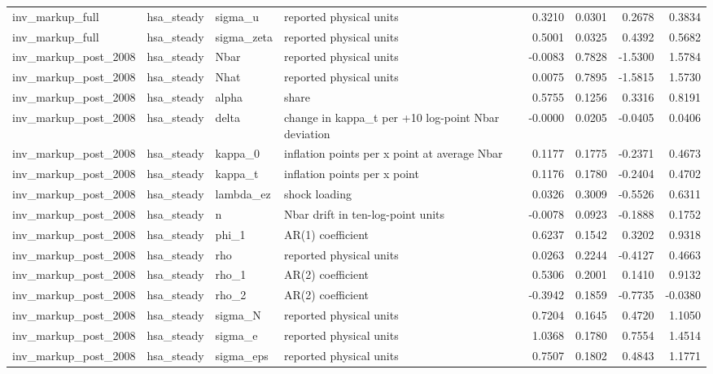 \begin{tabular}{llllrrrr}
inv\_markup\_full & hsa\_steady & sigma\_u & reported physical units & 0.3210 & 0.0301 & 0.2678 & 0.3834 \\
inv\_markup\_full & hsa\_steady & sigma\_zeta & reported physical units & 0.5001 & 0.0325 & 0.4392 & 0.5682 \\
inv\_markup\_post\_2008 & hsa\_steady & Nbar & reported physical units & -0.0083 & 0.7828 & -1.5300 & 1.5784 \\
inv\_markup\_post\_2008 & hsa\_steady & Nhat & reported physical units & 0.0075 & 0.7895 & -1.5815 & 1.5730 \\
inv\_markup\_post\_2008 & hsa\_steady & alpha & share & 0.5755 & 0.1256 & 0.3316 & 0.8191 \\
inv\_markup\_post\_2008 & hsa\_steady & delta & change in kappa\_t per +10 log-point Nbar deviation & -0.0000 & 0.0205 & -0.0405 & 0.0406 \\
inv\_markup\_post\_2008 & hsa\_steady & kappa\_0 & inflation points per x point at average Nbar & 0.1177 & 0.1775 & -0.2371 & 0.4673 \\
inv\_markup\_post\_2008 & hsa\_steady & kappa\_t & inflation points per x point & 0.1176 & 0.1780 & -0.2404 & 0.4702 \\
inv\_markup\_post\_2008 & hsa\_steady & lambda\_ez & shock loading & 0.0326 & 0.3009 & -0.5526 & 0.6311 \\
inv\_markup\_post\_2008 & hsa\_steady & n & Nbar drift in ten-log-point units & -0.0078 & 0.0923 & -0.1888 & 0.1752 \\
inv\_markup\_post\_2008 & hsa\_steady & phi\_1 & AR(1) coefficient & 0.6237 & 0.1542 & 0.3202 & 0.9318 \\
inv\_markup\_post\_2008 & hsa\_steady & rho & reported physical units & 0.0263 & 0.2244 & -0.4127 & 0.4663 \\
inv\_markup\_post\_2008 & hsa\_steady & rho\_1 & AR(2) coefficient & 0.5306 & 0.2001 & 0.1410 & 0.9132 \\
inv\_markup\_post\_2008 & hsa\_steady & rho\_2 & AR(2) coefficient & -0.3942 & 0.1859 & -0.7735 & -0.0380 \\
inv\_markup\_post\_2008 & hsa\_steady & sigma\_N & reported physical units & 0.7204 & 0.1645 & 0.4720 & 1.1050 \\
inv\_markup\_post\_2008 & hsa\_steady & sigma\_e & reported physical units & 1.0368 & 0.1780 & 0.7554 & 1.4514 \\
inv\_markup\_post\_2008 & hsa\_steady & sigma\_eps & reported physical units & 0.7507 & 0.1802 & 0.4843 & 1.1771 \\

\end{tabular}
